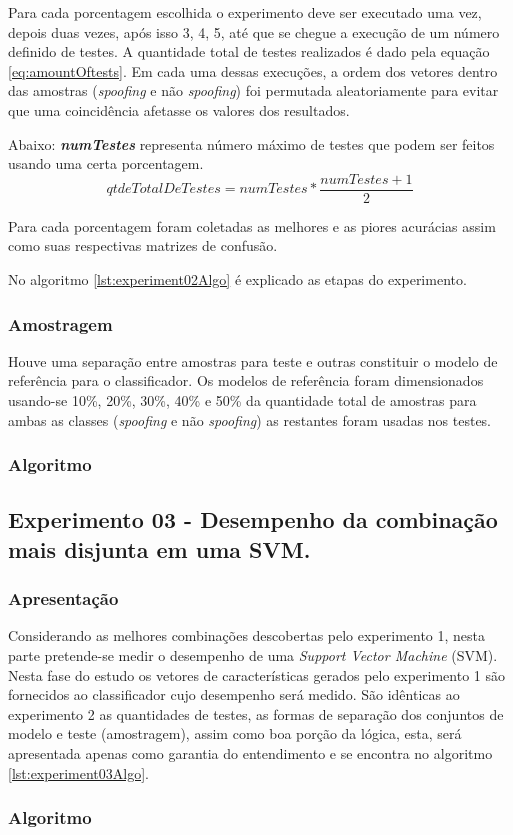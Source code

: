 				\par Para cada porcentagem escolhida o experimento deve ser executado uma vez, depois duas vezes, após isso 3, 4, 5, até que se chegue a execução de um número definido de testes. A quantidade total de testes realizados é dado pela equação \ref{eq:amountOftests}. Em cada uma dessas execuções, a ordem dos vetores dentro das amostras (\textit{spoofing} e não \textit{spoofing}) foi permutada aleatoriamente para evitar que uma coincidência afetasse os valores dos resultados.
				
				\par Abaixo: \textit{\textbf{numTestes}} representa número máximo de testes que podem ser feitos usando uma certa porcentagem.
				\begin{equation}
					\label{eq:amountOftests}
					qtdeTotalDeTestes= numTestes * \dfrac{numTestes + 1}{2}
				\end{equation}
				
				\par Para cada porcentagem foram coletadas as melhores e as piores acurácias assim como suas respectivas matrizes de confusão.
				
				\par No algoritmo \ref{lst:experiment02Algo} é explicado as etapas do experimento.
								
			\subsubsection{Amostragem}
				\par Houve uma separação entre amostras para teste e outras constituir o modelo de referência para o classificador. Os modelos de referência foram dimensionados usando-se 10\%, 20\%, 30\%, 40\% e 50\% da quantidade total de amostras para ambas as classes (\textit{spoofing} e não \textit{spoofing}) as restantes foram usadas nos testes.	
			\subsubsection{Algoritmo}
			

		\subsection{Experimento 03 - Desempenho da combinação mais disjunta em uma SVM.}
		\label{chap:propApproach:sec:Experimento03}
			\subsubsection{Apresentação}
				\par Considerando as melhores combinações descobertas pelo experimento 1, nesta parte pretende-se medir o desempenho de uma \textit{Support Vector Machine} (SVM). Nesta fase do estudo os vetores de características gerados pelo experimento 1 são fornecidos ao classificador cujo desempenho será medido. São idênticas ao experimento 2 as quantidades de testes, as formas de separação dos conjuntos de modelo e teste (amostragem), assim como boa porção da lógica, esta, será apresentada apenas como garantia do entendimento e se encontra no algoritmo \ref{lst:experiment03Algo}.

			\subsubsection{Algoritmo}
			